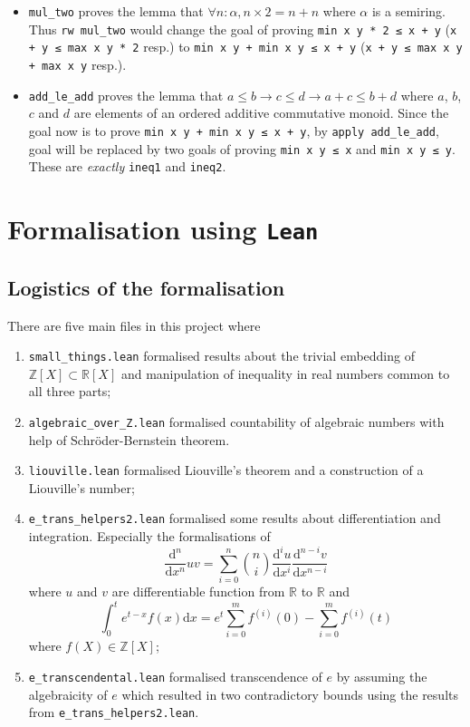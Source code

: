 \documentclass{report}
\theoremstyle{definition}
\begin{document}
\begin{itemize}
  \item {\tt \small mul\_two} proves the lemma that $\forall n:\alpha, n\times 2 = n+n$ where $\alpha$ is a semiring. Thus {\tt \small rw mul\_two} would change the goal of proving {\tt \small min x y * 2 ≤ x + y} ({\tt \small x + y ≤ max x y * 2} resp.) to {\tt \small min x y + min x y ≤ x + y} ({\tt \small x + y ≤ max x y + max x y} resp.).
  \item {\tt \small add\_le\_add} proves the lemma that $a \le b \to c \le d \to a + c \le b + d$ where $a$, $b$, $c$ and $d$ are elements of an ordered additive commutative monoid. Since the goal now is to prove {\tt \small min x y + min x y ≤ x + y}, by {\tt \small apply add\_le\_add}, goal will be replaced by two goals of proving {\tt \small min x y ≤ x} and {\tt \small min x y ≤ y}. These are {\it exactly} {\tt \small ineq1} and {\tt \small ineq2}.
\end{itemize}

\chapter{Formalisation using {\tt Lean}}\label{fmlsn}

\section*{Logistics of the formalisation}
There are five main files in this project where 
\begin{enumerate}
\item {\tt \small small\_things.lean} formalised results about the trivial embedding of $\mathbb Z[X]\subset \mathbb R[X]$ and manipulation of inequality in real numbers common to all three parts;
\item {\tt \small algebraic\_over\_Z.lean} formalised countability of algebraic numbers with help of Schröder-Bernstein theorem.
\item {\tt \small liouville.lean} formalised Liouville's theorem and a construction of a Liouville's number;
\item {\tt \small e\_trans\_helpers2.lean} formalised some results about differentiation and integration. Especially the formalisations of 
$$
\frac{\mathrm d^n}{\mathrm d x^n}uv = \sum_{i=0}^n{n \choose i}\frac{\mathrm d^i u}{\mathrm d x^i}\frac{\mathrm d^{n-i} v}{\mathrm d x^{n-i}}
$$ where $u$ and $v$ are differentiable function from $\mathbb R$ to $\mathbb R$ and
$$
\int_0^t e^{t-x}f(x)\mathrm{d}x=e^t\sum_{i=0}^m f^{(i)}(0)-\sum_{i=0}^m f^{(i)}(t)
$$ where $f(X)\in\mathbb Z[X]$;
\item {\tt \small e\_transcendental.lean} formalised transcendence of $e$ by assuming the algebraicity of $e$ which resulted in two contradictory bounds using the results from {\tt \small e\_trans\_helpers2.lean}.
\end{enumerate}
\end{document}

